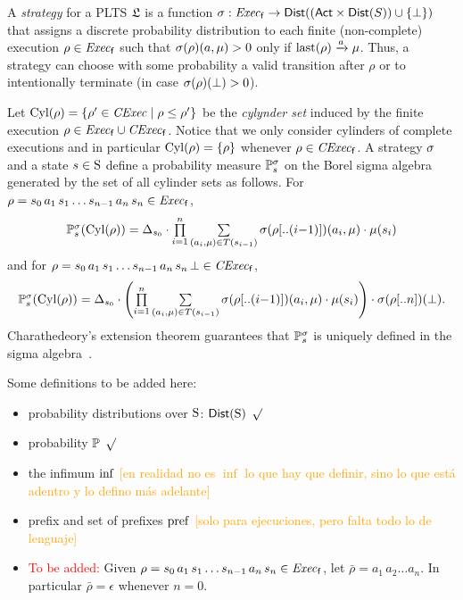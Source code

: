 A \emph{strategy} for a PLTS $\model$ is a function $\strat:
\execf \to \dist((\ACT\times\dist(S))\cup\{\complete\})$ that assigns
a discrete probability distribution to each finite (non-complete)
execution $\rho\in\execf$ such that $\strat(\rho)(a,\mu) > 0$ only
if $\last(\rho)\reach{a}\mu$.  Thus, a strategy can choose with some
probability a valid transition after $\rho$ or to intentionally
terminate (in case $\strat(\rho)(\complete)>0$).

Let $\Cyl(\rho)=\{\rho'\in\cexec\mid{\rho\leq\rho'}\}$ be the
\emph{cylynder set} induced by the finite execution
$\rho\in\execf\cup\cexecf$.  Notice that we only consider cylinders of
complete executions and in particular $\Cyl(\rho)=\{\rho\}$ whenever
$\rho\in\cexecf$.
%
A strategy $\strat$ and a state $s\in\S$ define a probability
measure $\Prob^\strat_s$ on the Borel sigma algebra generated by the
set of all cylinder sets as follows.
%
For $\rho = s_0\, a_1\, s_1\ldots s_{n-1}\, a_n\, s_n \in \execf$,
%
\[
  \textstyle\Prob^\strat_s(\Cyl(\rho)) = \Dirac_{s_0}\cdot\prod\limits_{i=1}^n\sum\limits_{(a_i,\mu)\in T(s_{i-1})}\strat(\rho[..(i{-}1)])(a_i,\mu)\cdot\mu(s_i)
\]
%
and for
$\rho = s_0\, a_1\, s_1\ldots s_{n-1}\, a_n\, s_n\, \complete \in \cexecf$,
%
\[
  \textstyle\Prob^\strat_s(\Cyl(\rho)) = \Dirac_{s_0}\cdot\left(\prod\limits_{i=1}^n\sum\limits_{(a_i,\mu)\in T(s_{i-1})}\strat(\rho[..(i{-}1)])(a_i,\mu)\cdot\mu(s_i)\right)\cdot\strat(\rho[..n])(\complete).
\]
%
Charathedeory's extension theorem guarantees that $\Prob^\strat_s$ is
uniquely defined in the sigma algebra~\cite{Segala95}.











\bigskip

Some definitions to be added here:

\begin{itemize}
    \item probability distributions over $\S$: $\dist(\S)$ \textcolor{green}{$\surd$}
    \item probability $\Prob$  \textcolor{green}{$\surd$}
    \item the infimum $\infim$  \textcolor{orange}{[en realidad no es $\inf$ lo que hay que definir, sino lo que est\'a adentro y lo defino m\'as adelante]}
    \item prefix and set of prefixes $\pref$ \textcolor{orange}{[solo para ejecuciones, pero falta todo lo de lenguaje]}
    \item \textcolor{red}{To be added:}
      Given $\rho = s_0\, a_1\, s_1\ldots s_{n-1}\, a_n\, s_n \in \execf$,
      let $\bar{\rho} = a_1\, a_2\ldots a_n$.
      In particular $\bar{\rho} = \epsilon$ whenever $n=0$.

\end{itemize}

